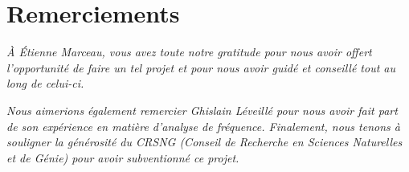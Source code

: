 \section*{Remerciements}
\begin{center}
	\vspace{8cm}
	
	\textit{À Étienne Marceau, vous avez toute notre gratitude pour nous avoir offert l'opportunité de faire un tel projet et pour nous avoir guidé et conseillé tout au long de celui-ci.} \\
	\vspace{0.5cm}
	
	\textit{Nous aimerions également remercier Ghislain Léveillé pour nous avoir fait part de son expérience en matière d'analyse de fréquence. Finalement, nous tenons à souligner la générosité du CRSNG (Conseil de Recherche en Sciences Naturelles et de Génie) pour avoir subventionné ce projet.}
\end{center}